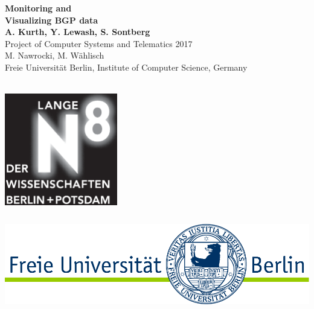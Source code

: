 \documentclass[a0,portrait,posterdraft]{a0poster}
\begin{document}


\begin{minipage}[b]{0.667\linewidth}
\VeryHuge \textbf{Monitoring and\\Visualizing BGP data} \\[.6cm]
\huge \textbf{{A. Kurth, Y. Lewash, S. Sontberg}}\\[2.4cm] %
\Huge Project of Computer Systems and Telematics 2017\\[0.5cm] %
\huge M. Nawrocki, M. W\"ahlisch\\[0.5cm] %
\huge Freie Universit\"at Berlin, Institute of Computer Science, Germany\\[0.4cm] %
\tiny \\
\end{minipage}
%
\begin{minipage}[b]{0.333\linewidth}

{\includegraphics[height=4.9cm,interpolate]{LN_Logo.eps}}
\hspace{1cm}
{\includegraphics[height=4.9cm,interpolate]{FULogo-RGB.pdf}}\\[2cm]
    \vspace{1.5cm}
\end{minipage}
\end{document}
